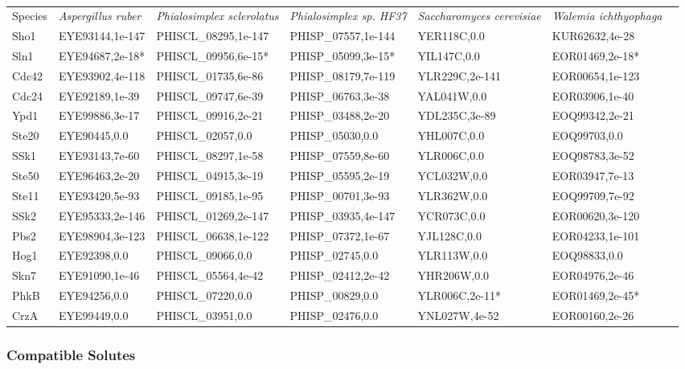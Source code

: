 \documentclass[fontsize=10pt, paper=a4,fleqn, ]{wlscirep}
\newcommand{\aspRub}{\textit{Aspergillus ruber}}
\newcommand{\walIch}{\textit{Walemia ichthyophaga}}
\newcommand{\sacCer}{\textit{Saccharomyces cerevisiae}}
\newcommand{\phiSp}{\textit{Phialosimplex sp. HF37}}
\newcommand{\phiScl}{\textit{Phialosimplex sclerolatus}}
\begin{document}
\begin{table}
  \begin{tabular}{|l|l|l|l|l|l|l|}
    Species &{\aspRub}	        &        {\phiScl}     &      {\phiSp}        &   {\sacCer}     & {\walIch}      \\
    Sho1    &EYE93144,1e-147	&PHISCL_08295,1e-147	&PHISP_07557,1e-144	&YER118C,0.0	&KUR62632,4e-28  \\
    Sln1    &EYE94687,2e-18*	&PHISCL_09956,6e-15*	&PHISP_05099,3e-15*	&YIL147C,0.0	&EOR01469,2e-18* \\
    Cdc42   &EYE93902,4e-118	&PHISCL_01735,6e-86	&PHISP_08179,7e-119	&YLR229C,2e-141	&EOR00654,1e-123 \\
    Cdc24   &EYE92189,1e-39	&PHISCL_09747,6e-39	&PHISP_06763,3e-38	&YAL041W,0.0	&EOR03906,1e-40  \\
    Ypd1    &EYE99886,3e-17	&PHISCL_09916,2e-21	&PHISP_03488,2e-20	&YDL235C,3e-89	&EOQ99342,2e-21  \\
    Ste20   &EYE90445,0.0	&PHISCL_02057,0.0	&PHISP_05030,0.0	&YHL007C,0.0	&EOQ99703,0.0    \\
    SSk1    &EYE93143,7e-60	&PHISCL_08297,1e-58	&PHISP_07559,8e-60	&YLR006C,0.0	&EOQ98783,3e-52  \\
    Ste50   &EYE96463,2e-20	&PHISCL_04915,3e-19	&PHISP_05595,2e-19	&YCL032W,0.0	&EOR03947,7e-13  \\
    Ste11   &EYE93420,5e-93	&PHISCL_09185,1e-95	&PHISP_00701,3e-93	&YLR362W,0.0	&EOQ99709,7e-92  \\
    SSk2    &EYE95333,2e-146	&PHISCL_01269,2e-147	&PHISP_03935,4e-147	&YCR073C,0.0	&EOR00620,3e-120 \\
    Pbs2    &EYE98904,3e-123	&PHISCL_06638,1e-122	&PHISP_07372,1e-67	&YJL128C,0.0	&EOR04233,1e-101 \\
    Hog1    &EYE92398,0.0	&PHISCL_09066,0.0	&PHISP_02745,0.0	&YLR113W,0.0	&EOQ98833,0.0    \\
    Skn7    &EYE91090,1e-46	&PHISCL_05564,4e-42	&PHISP_02412,2e-42	&YHR206W,0.0	&EOR04976,2e-46  \\ 
    \hline\hline
    PhkB    &EYE94256,0.0	&PHISCL_07220,0.0	&PHISP_00829,0.0	&YLR006C,2e-11*	&EOR01469,2e-45*  \\
    CrzA    &EYE99449,0.0	&PHISCL_03951,0.0	&PHISP_02476,0.0	&YNL027W,4e-52	&EOR00160,2e-26  \\ 
  \end{tabular}
  \caption{\label{tab:halophile} }
\end{table}

\subsubsection{Compatible Solutes}
\end{document}
